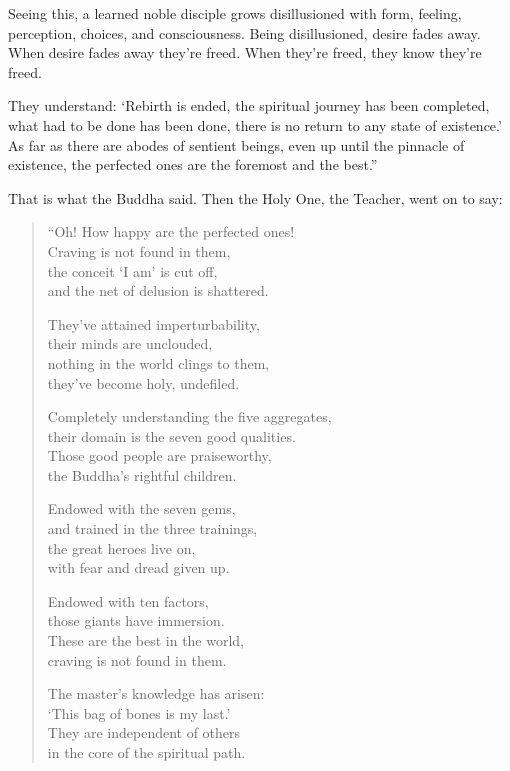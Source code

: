 \documentclass[12pt,openany]{book}%
\begin{document}
Seeing this, a learned noble disciple grows disillusioned with form, feeling, perception, choices, and consciousness. Being disillusioned, desire fades away. When desire fades away they’re freed. When they’re freed, they know they’re freed. 

They understand: ‘Rebirth is ended, the spiritual journey has been completed, what had to be done has been done, there is no return to any state of existence.’ As far as there are abodes of sentient beings, even up until the pinnacle of existence, the perfected ones are the foremost and the best.” 

That is what the Buddha said. Then the Holy One, the Teacher, went on to say: 

\begin{verse}%
“Oh! How happy are the perfected ones! \\
Craving is not found in them, \\
the conceit ‘I am’ is cut off, \\
and the net of delusion is shattered. 

They’ve attained imperturbability, \\
their minds are unclouded, \\
nothing in the world clings to them, \\
they’ve become holy, undefiled. 

Completely understanding the five aggregates, \\
their domain is the seven good qualities. \\
Those good people are praiseworthy, \\
the Buddha’s rightful children. 

Endowed with the seven gems, \\
and trained in the three trainings, \\
the great heroes live on, \\
with fear and dread given up. 

Endowed with ten factors, \\
those giants have immersion. \\
These are the best in the world, \\
craving is not found in them. 

The master’s knowledge has arisen: \\
‘This bag of bones is my last.’ \\
They are independent of others \\
in the core of the spiritual path. 


\end{verse}
\end{document}
